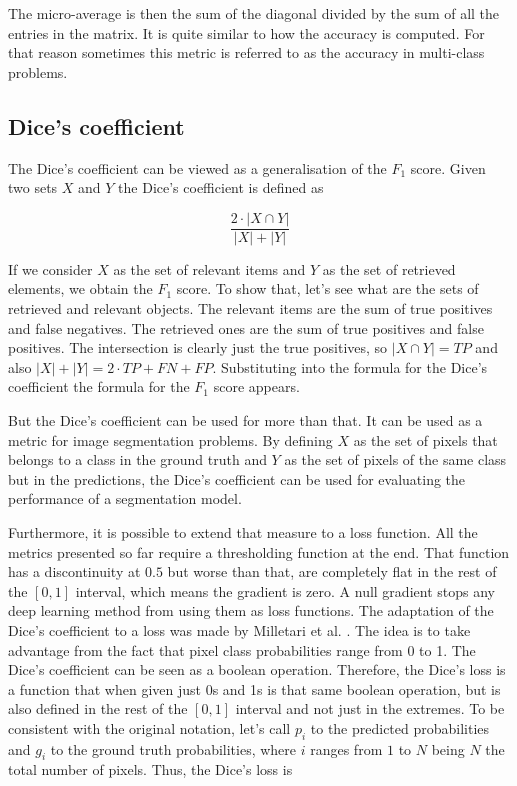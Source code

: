 The micro-average is then the sum of the diagonal divided by the sum of all the entries in the matrix. It is quite similar to how the accuracy is computed. For that reason sometimes this metric is referred to as the accuracy in multi-class problems.

\newpage
\subsection{Dice's coefficient}\label{subsec:dice}

The Dice's coefficient can be viewed as a generalisation of the $F_1$ score. Given two sets $X$ and $Y$ the Dice's coefficient is defined as 

\begin{equation}
    \frac{2\cdot |X \cap Y|}{|X| + |Y|}
\end{equation}

If we consider $X$ as the set of relevant items and $Y$ as the set of retrieved elements, we obtain the $F_1$ score. To show that, let's see what are the sets of retrieved and relevant objects. The relevant items are the sum of true positives and false negatives. The retrieved ones are the sum of true positives and false positives. The intersection is clearly just the true positives, so $|X\cap Y| = TP$ and also $|X|+|Y|=2\cdot TP + FN + FP$. Substituting into the formula for the Dice's coefficient the formula for the $F_1$ score appears.

But the Dice's coefficient can be used for more than that. It can be used as a metric for image segmentation problems. By defining $X$ as the set of pixels that belongs to a class in the ground truth and $Y$ as the set of pixels of the same class but in the predictions, the Dice's coefficient can be used for evaluating the performance of a segmentation model. 

Furthermore, it is possible to extend that measure to a loss function. All the metrics presented so far require a thresholding function at the end. That function has a discontinuity at $0.5$ but worse than that, are completely flat in the rest of the $[0,1]$ interval, which means the gradient is zero. A null gradient stops any deep learning method from using them as loss functions. The adaptation of the Dice's coefficient to a loss was made by Milletari et al. \cite{milletari2016vnet}. The idea is to take advantage from the fact that pixel class probabilities range from 0 to 1. The Dice's coefficient can be seen as a boolean operation. Therefore, the Dice's loss is a function that when given just 0s and 1s is that same boolean operation, but is also defined in the rest of the $[0,1]$ interval and not just in the extremes. To be consistent with the original notation, let's call $p_i$ to the predicted probabilities and $g_i$ to the ground truth probabilities, where $i$ ranges from $1$ to $N$ being $N$ the total number of pixels. Thus, the Dice's loss is

